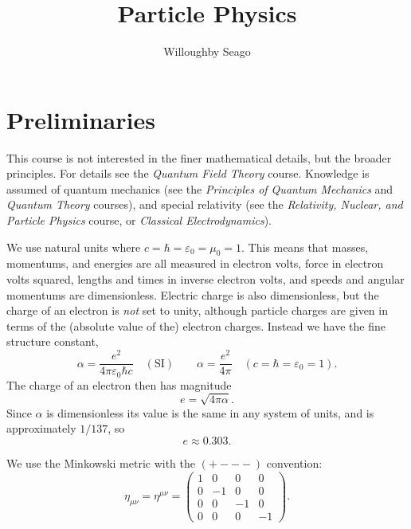 \documentclass[fleqn]{NotesClass}
\title{Particle Physics}
\author{Willoughby Seago}
\date{}
\newcommand{\course}[1]{\textit{#1}}
\begin{document}
    \frontmatter
    \titlepage
    \innertitlepage{}
    \tableofcontents
    \listoffigures
    \mainmatter
    
    \chapter{Preliminaries}
    This course is not interested in the finer mathematical details, but the broader principles.
    For details see the \course{Quantum Field Theory} course.
    Knowledge is assumed of quantum mechanics (see the \course{Principles of Quantum Mechanics} and \course{Quantum Theory} courses), and special relativity (see the \course{Relativity, Nuclear, and Particle Physics} course, or \course{Classical Electrodynamics}).
    
    We use natural units where \(c = \hbar = \varepsilon_0 = \mu_0 = 1\).
    This means that masses, momentums, and energies are all measured in electron volts, force in electron volts squared, lengths and times in inverse electron volts, and speeds and angular momentums are dimensionless.
    Electric charge is also dimensionless, but the charge of an electron is  \emph{not} set to unity, although particle charges are given in terms of the (absolute value of the) electron charges.
    Instead we have the fine structure constant,
    \begin{equation}
        \alpha = \frac{e^2}{4\pi \varepsilon_0 \hbar c} \quad (\text{SI}) \qquad \alpha = \frac{e^2}{4\pi} \quad (c = \hbar = \varepsilon_0 = 1).
    \end{equation}
    The charge of an electron then has magnitude
    \begin{equation}
        e = \sqrt{4\pi \alpha}.
    \end{equation}
    Since \(\alpha\) is dimensionless its value is the same in any system of units, and is approximately \(1/137\), so
    \begin{equation}
        e \approx \num{0.303}.
    \end{equation}
    
    We use the Minkowski metric with the \(({+}{-}{-}{-})\) convention:
    \begin{equation}
        \eta_{\mu\nu} = \eta^{\mu\nu} = 
        \begin{pmatrix}
            1 & 0 & 0 & 0\\
            0 & -1 & 0 & 0\\
            0 & 0 & -1 & 0\\
            0 & 0 & 0 & -1
        \end{pmatrix}
        .
    \end{equation}
    
\end{document}
